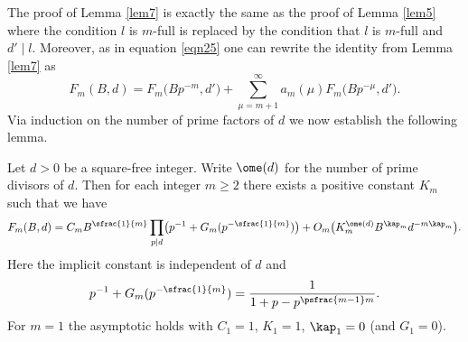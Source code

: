The proof of Lemma \ref{lem7} is exactly the same as the proof of Lemma \ref{lem5} where the condition $l$ is $m$-full is replaced by the condition that $l$ is $m$-full and $d'\mid l$. Moreover, as in equation \eqref{eqn25} one can rewrite the identity from Lemma \ref{lem7} as
\begin{equation}\label{eqn27}
F_m(B,d) = F_m\bigl(Bp^{-m},d'\bigr) +\sum_{\mu=m+1}^\infty a_m(\mu) F_m\bigl(Bp^{-\mu},d'\bigr).
\end{equation}
Via induction on the number of prime factors of $d$ we now establish the following lemma.

\begin{lemma}\label{lem8}
Let $d>0$ be a square-free integer. Write $\ome(d)$ for the number of prime divisors of $d$. Then for each integer $m\geq 2$ there exists a positive constant $K_m$ such that we have
\[
F_m(B,d)=C_mB^{\sfrac{1}{m}}\prod_{p\mid d} \bigl(p^{-1}+G_m(p^{-\sfrac{1}{m}})\bigr)+ O_m\bigl(K_m^{\ome(d)}B^{\kap_m}d^{-m\kap_m}\bigr).
\]
Here the implicit constant is independent of $d$ and
\begin{equation}
\label{eq:G_m_explicit}
p^{-1}+G_{m}(p^{-\sfrac{1}{m}})=\frac1{1+p-p^{\psfrac{m-1}m}}.
\end{equation}
For $m=1$ the asymptotic holds with $C_1=1$, $K_1=1$, $\kap_1=0$ (and $G_1=0$).
\end{lemma}

